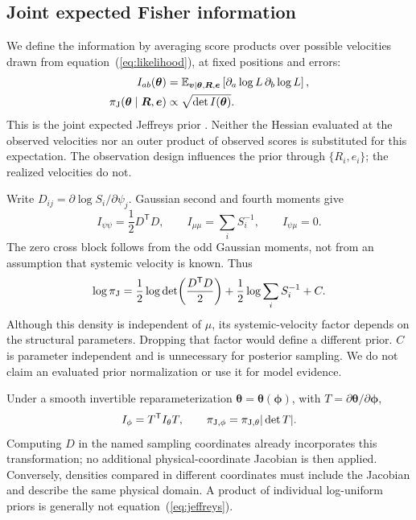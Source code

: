\subsection{Joint expected Fisher information}
\label{sec:fisher}
We define the information by averaging score products over possible velocities drawn from equation~(\ref{eq:likelihood}), at fixed positions and errors:
\begin{align}
 I_{ab}(\boldsymbol{\theta})
  &=\mathbb{E}_{\boldsymbol v\mid\boldsymbol{\theta},\boldsymbol R,\boldsymbol e}
       \left[\partial_a\log L\,\partial_b\log L\right],\\
 \pi_{\rm J}(\boldsymbol{\theta}\mid\boldsymbol R,\boldsymbol e)
  &\propto \sqrt{\det I(\boldsymbol{\theta})}.
 \label{eq:jeffreys}
\end{align}
This is the joint expected Jeffreys prior \citep{jeffreys1946,ghosh2011}. Neither the Hessian evaluated at the observed velocities nor an outer product of observed scores is substituted for this expectation. The observation design influences the prior through $\{R_i,e_i\}$; the realized velocities do not.

Write $D_{ij}=\partial\log S_i/\partial\psi_j$. Gaussian second and fourth moments give
\begin{equation}
 I_{\psi\psi}=\frac{1}{2}D^{\mathsf T}D,\qquad
 I_{\mu\mu}=\sum_i S_i^{-1},\qquad I_{\psi\mu}=0 .
 \label{eq:fisherblocks}
\end{equation}
The zero cross block follows from the odd Gaussian moments, not from an assumption that systemic velocity is known. Thus
\begin{equation}
 \log\pi_{\rm J}
   =\frac{1}{2}\log\det\!\left(\frac{D^{\mathsf T}D}{2}\right)
      +\frac{1}{2}\log\sum_i S_i^{-1}+C .
 \label{eq:logprior}
\end{equation}
Although this density is independent of $\mu$, its systemic-velocity factor depends on the structural parameters. Dropping that factor would define a different prior. $C$ is parameter independent and is unnecessary for posterior sampling. We do not claim an evaluated prior normalization or use it for model evidence.

Under a smooth invertible reparameterization $\boldsymbol{\theta}=\boldsymbol{\theta}(\boldsymbol{\phi})$, with $T=\partial\boldsymbol{\theta}/\partial\boldsymbol{\phi}$,
\begin{equation}
 I_\phi=T^{\mathsf T}I_\theta T,\qquad
 \pi_{\rm J,\phi}=\pi_{\rm J,\theta}|\det T|.
 \label{eq:transformation}
\end{equation}
Computing $D$ in the named sampling coordinates already incorporates this transformation; no additional physical-coordinate Jacobian is then applied. Conversely, densities compared in different coordinates must include the Jacobian and describe the same physical domain. A product of individual log-uniform priors is generally not equation~(\ref{eq:jeffreys}).


